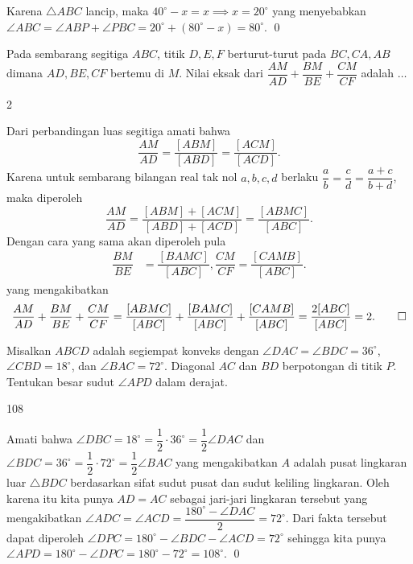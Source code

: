 \documentclass[11pt]{scrartcl}
\begin{document}
\begin{soalbaru}
\begin{solusi}
		Karena $\triangle ABC$ lancip, maka $40^\circ -x = x \implies x = 20^\circ$ yang menyebabkan $\angle ABC = \angle ABP + \angle PBC = 20^\circ + (80^\circ-x)=80^\circ.$ \qed
		\end{solusi}
	\end{soalbaru}
	
	\begin{soalbaru}
			Pada sembarang segitiga $ABC$, titik $D,E,F$ berturut-turut pada $BC,CA,AB$ dimana $AD,BE,CF$ bertemu di $M$. Nilai eksak dari $\dfrac{AM}{AD}+\dfrac{BM}{BE}+\dfrac{CM}{CF}$ adalah $\dots$
			
			\begin{jawaban}
			2
			\end{jawaban}
			\begin{solusi}
			Dari perbandingan luas segitiga amati bahwa $$\dfrac{AM}{AD}=\dfrac{[ABM]}{[ABD]}=\dfrac{[ACM]}{[ACD]}.$$
			Karena untuk sembarang bilangan real tak nol $a,b,c,d$ berlaku $\dfrac{a}{b}=\dfrac{c}{d}=\dfrac{a+c}{b+d}$, maka diperoleh $$\dfrac{AM}{AD}=\dfrac{[ABM]+[ACM]}{[ABD]+[ACD]}=\dfrac{[ABMC]}{[ABC]}.$$
			Dengan cara yang sama akan diperoleh pula 
			\begin{align*}
			\dfrac{BM}{BE}&=\dfrac{[BAMC]}{[ABC]},
			\dfrac{CM}{CF}=\dfrac{[CAMB]}{[ABC]}.
			\end{align*}
			yang mengakibatkan
			$$\dfrac{AM}{AD}+\dfrac{BM}{BE}+\dfrac{CM}{CF}=\dfrac{[ABMC]}{[ABC]}+\dfrac{[BAMC]}{[ABC]}+\dfrac{[CAMB]}{[ABC]}=\dfrac{2[ABC]}{[ABC]}=2.\qed$$
			\end{solusi}
		\end{soalbaru}
	\vspace{10pt}
	\begin{soalbaru}
		Misalkan $ABCD$ adalah segiempat konveks dengan $\angle DAC=\angle BDC = 36^\circ$, $\angle CBD = 18^\circ$, dan $\angle BAC = 72^\circ$. Diagonal $AC$ dan $BD$ berpotongan di titik $P$. Tentukan besar sudut $\angle APD$ dalam derajat. %
		\begin{jawaban}
		108
		\end{jawaban}
		\begin{solusi}
		Amati bahwa $\angle DBC = 18^\circ = \dfrac{1}{2}\cdot 36^\circ = \dfrac{1}{2} \angle DAC$ dan $\angle BDC = 36^\circ = \dfrac{1}{2}\cdot 72^\circ = \dfrac{1}{2}\angle BAC$ yang mengakibatkan $A$ adalah pusat lingkaran luar $\triangle BDC$ berdasarkan sifat sudut pusat dan sudut keliling lingkaran. Oleh karena itu kita punya $AD = AC$ sebagai jari-jari lingkaran tersebut yang mengakibatkan $\angle ADC = \angle ACD = \dfrac{180^\circ-\angle DAC}{2}=72^\circ$. Dari fakta tersebut dapat diperoleh $\angle DPC = 180^\circ - \angle BDC - \angle ACD = 72^\circ$ sehingga kita punya $\angle APD = 180^\circ - \angle DPC = 180^\circ - 72^\circ = 108^\circ.$ \qed
		\end{solusi}
	\end{soalbaru}
	
\end{document}
